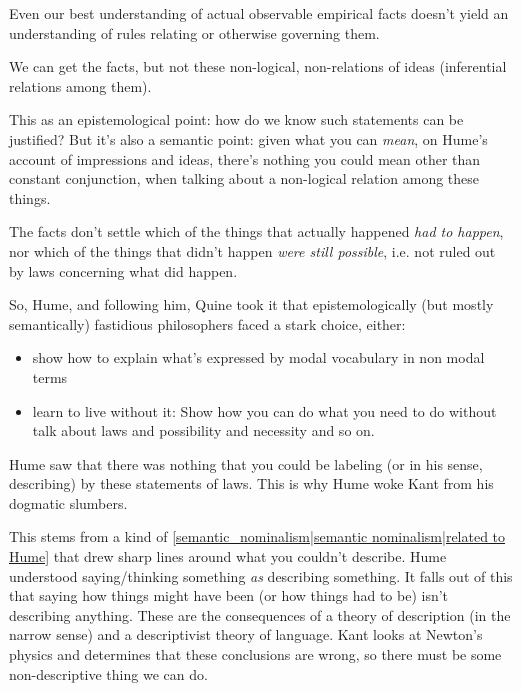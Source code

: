 Even our best understanding of actual observable empirical facts doesn't yield an understanding of rules relating or otherwise governing them.

We can get the facts, but not these non-logical, non-relations of ideas (inferential relations among them).

This as an epistemological point: how do we know such statements can be justified? But it's also a semantic point: given what you can \emph{mean}, on Hume's account of impressions and ideas, there's nothing you could mean other than constant conjunction, when talking about a non-logical relation among these things.

The facts don't settle which of the things that actually happened \emph{had to happen}, nor which of the things that didn't happen \emph{were still possible}, i.e. not ruled out by laws concerning what did happen.

So, Hume, and following him, Quine took it that epistemologically (but mostly semantically) fastidious philosophers faced a stark choice, either:
\begin{itemize}
\item show how to explain what's expressed by modal vocabulary in non modal terms
\item learn to live without it: Show how you can do what you need to do without talk about laws and possibility and necessity and so on.
\end{itemize}

Hume saw that there was nothing that you could be labeling (or in his sense, describing) by these statements of laws. This is why Hume woke Kant from his dogmatic slumbers.

This stems from a kind of \ref{semantic_nominalism|semantic nominalism|related to Hume} that drew sharp lines around what you couldn't describe. Hume understood saying/thinking something \emph{as} describing something. It falls out of this that saying how things might have been (or how things had to be) isn't describing anything. These are the consequences of a theory of description (in the narrow sense) and a descriptivist theory of language. Kant looks at Newton's physics and determines that these conclusions are wrong, so there must be some non-descriptive thing we can do.